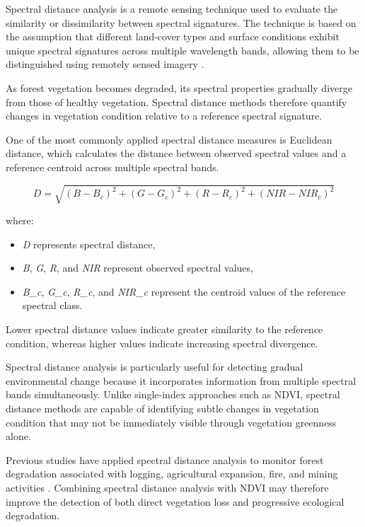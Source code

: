 \documentclass[a4paper,12pt]{report}
\begin{document}
Spectral distance analysis is a remote sensing technique used to evaluate the similarity or dissimilarity between spectral signatures. The technique is based on the assumption that different land-cover types and surface conditions exhibit unique spectral signatures across multiple wavelength bands, allowing them to be distinguished using remotely sensed imagery \citep{richards2013remote}.

As forest vegetation becomes degraded, its spectral properties gradually diverge from those of healthy vegetation. Spectral distance methods therefore quantify changes in vegetation condition relative to a reference spectral signature.

One of the most commonly applied spectral distance measures is Euclidean distance, which calculates the distance between observed spectral values and a reference centroid across multiple spectral bands.

\begin{equation}
D = \sqrt{(B-B_c)^2 + (G-G_c)^2 + (R-R_c)^2 + (NIR-NIR_c)^2}
\end{equation}

where:

\begin{itemize}
\item \textit{D} represents spectral distance,
\item \textit{B}, \textit{G}, \textit{R}, and \textit{NIR} represent observed spectral values,
\item \textit{B\_c}, \textit{G\_c}, \textit{R\_c}, and \textit{NIR\_c} represent the centroid values of the reference spectral class.
\end{itemize}

Lower spectral distance values indicate greater similarity to the reference condition, whereas higher values indicate increasing spectral divergence.

Spectral distance analysis is particularly useful for detecting gradual environmental change because it incorporates information from multiple spectral bands simultaneously. Unlike single-index approaches such as NDVI, spectral distance methods are capable of identifying subtle changes in vegetation condition that may not be immediately visible through vegetation greenness alone.

Previous studies have applied spectral distance analysis to monitor forest degradation associated with logging, agricultural expansion, fire, and mining activities \citep{tarazona2020monitoring}. Combining spectral distance analysis with NDVI may therefore improve the detection of both direct vegetation loss and progressive ecological degradation.
\end{document}
